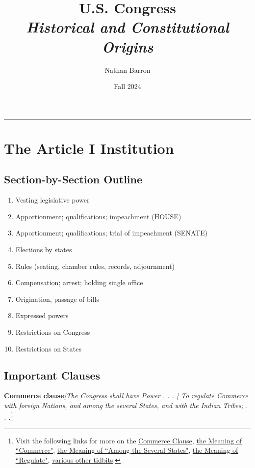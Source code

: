\documentclass[10pt]{article}
\title{\textbf{U.S. Congress}\\\textit{Historical and Constitutional Origins}}
\author{Nathan Barron}
\date{Fall 2024}
\begin{document}
\maketitle
\tableofcontents
\vspace{.25in}
\hrule
\vspace{.25in}

\section{The Article I Institution}

\subsection{Section-by-Section Outline}

\begin{enumerate}
    \item Vesting legislative power
    \item Apportionment; qualifications; impeachment (HOUSE)
    \item Apportionment; qualifications; trial of impeachment (SENATE)
    \item Elections by states
    \item Rules (seating, chamber rules, records, adjournment)
    \item Compensation; arrest; holding single office
    \item Origination, passage of bills
    \item Expressed powers
    \item Restrictions on Congress
    \item Restrictions on States
\end{enumerate}

\subsection{Important Clauses}

\textbf{Commerce clause}\newline \textit{[The Congress shall have Power . . . ] To regulate Commerce with foreign Nations, and among the several States, and with the Indian Tribes; . . .}\footnote{Visit the following links for more on the \href{https://constitution.congress.gov/browse/essay/artI-S8-C3-1/ALDE_00013403/}{Commerce Clause}, \href{https://constitution.congress.gov/browse/essay/artI-S8-C3-2/ALDE_00013404/}{the Meaning of ``Commerce"}, \href{https://constitution.congress.gov/browse/essay/artI-S8-C3-3/ALDE_00013405/}{the Meaning of ``Among the Several States"}, \href{https://constitution.congress.gov/browse/essay/artI-S8-C3-4/ALDE_00013406/}{the Meaning of ``Regulate"}, \href{https://constitution.congress.gov/browse/article-1/section-8/clause-3/}{various other tidbits}.} \\
\end{document}
